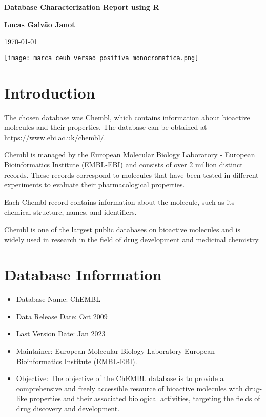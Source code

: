 \documentclass[10pt]{article}
\begin{document}
\begin{titlepage}
  \begin{center}
    \vspace*{3cm}
    
    \textbf{\LARGE Database Characterization Report using R}
    
    \vspace{2cm}
    
    \textbf{\large Lucas Galvão Janot}

     \today
    
    \vspace{1cm}
    
    
    \vspace{3cm}
    
    \texttt{[image: marca ceub versao positiva monocromatica.png]}
    
    \vspace{3cm}
    
    
    
  \end{center}
\end{titlepage}

\section{Introduction}

The chosen database was Chembl, which contains information about bioactive molecules and their properties. The database can be obtained at \url{https://www.ebi.ac.uk/chembl/}.

Chembl is managed by the European Molecular Biology Laboratory - European Bioinformatics Institute (EMBL-EBI) and consists of over 2 million distinct records. These records correspond to molecules that have been tested in different experiments to evaluate their pharmacological properties.

Each Chembl record contains information about the molecule, such as its chemical structure, names, and identifiers.

Chembl is one of the largest public databases on bioactive molecules and is widely used in research in the field of drug development and medicinal chemistry.

\section{Database Information}
\begin{itemize}
  \item Database Name: ChEMBL
  \item Data Release Date: Oct 2009
  \item Last Version Date: Jan 2023
  \item Maintainer: European Molecular Biology Laboratory European Bioinformatics Institute (EMBL-EBI).
  \item Objective: The objective of the ChEMBL database is to provide a comprehensive and freely accessible resource of bioactive molecules with drug-like properties and their associated biological activities, targeting the fields of drug discovery and development.
\end{itemize}
\end{document}
